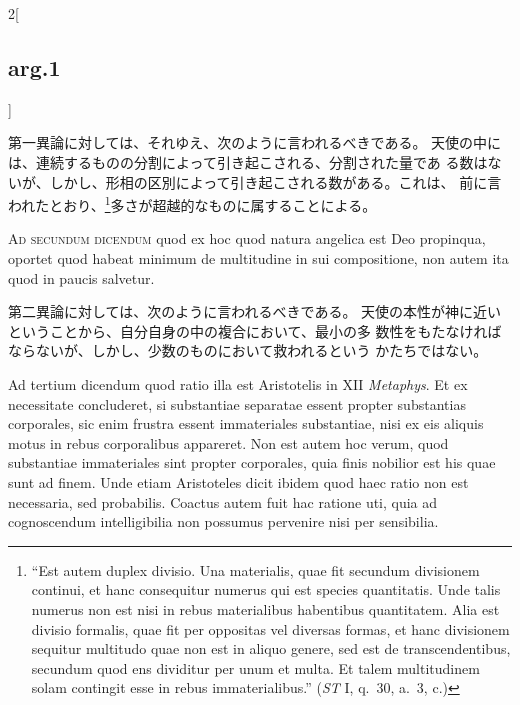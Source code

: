 \documentclass[paper=a4paper,fontsize=10pt,jafontsize=9pt,titlepage]{jlreq}
\begin{document}
\begin{paracol}{2}[\subsection{arg.1}]
\switchcolumn

第一異論に対しては、それゆえ、次のように言われるべきである。
天使の中には、連続するものの分割によって引き起こされる、分割された量であ
 る数はないが、しかし、形相の区別によって引き起こされる数がある。これは、
 前に言われたとおり、\footnote{``Est autem duplex divisio. Una
 materialis, quae fit secundum divisionem continui, et hanc consequitur
 numerus qui est species quantitatis. Unde talis numerus non est nisi in
 rebus materialibus habentibus quantitatem. Alia est divisio formalis,
 quae fit per oppositas vel diversas formas, et hanc divisionem sequitur
 multitudo quae non est in aliquo genere, sed est de transcendentibus,
 secundum quod ens dividitur per unum et multa. Et talem multitudinem
 solam contingit esse in rebus immaterialibus.'' ({\itshape ST} I,
 q.~30, a.~3, c.)}多さが超越的なものに属することによる。

\switchcolumn*[\subsection{ad.2}]

{\scshape Ad secundum dicendum} quod ex hoc quod natura
angelica est Deo propinqua, oportet quod habeat minimum de multitudine
in sui compositione, non autem ita quod in paucis salvetur.

\switchcolumn

第二異論に対しては、次のように言われるべきである。
天使の本性が神に近いということから、自分自身の中の複合において、最小の多
 数性をもたなければならないが、しかし、少数のものにおいて救われるという
 かたちではない。

\switchcolumn*[\subsection{ad.3}]

Ad tertium dicendum quod ratio illa est
Aristotelis in XII {\itshape Metaphys}. Et ex necessitate concluderet, si
substantiae separatae essent propter substantias corporales, sic enim
frustra essent immateriales substantiae, nisi ex eis aliquis motus in
rebus corporalibus appareret. Non est autem hoc verum, quod substantiae
immateriales sint propter corporales, quia finis nobilior est his quae
sunt ad finem. Unde etiam Aristoteles dicit ibidem quod haec ratio non
est necessaria, sed probabilis. Coactus autem fuit hac ratione uti, quia
ad cognoscendum intelligibilia non possumus pervenire nisi per
sensibilia.

\switchcolumn


\end{paracol}
\end{document}
